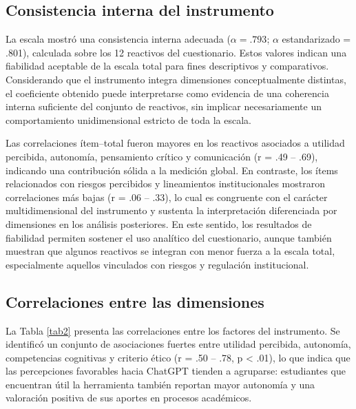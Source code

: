 \documentclass[spanish]{textolivre}
\begin{document}
\subsection{Consistencia interna del instrumento}

La escala mostró una consistencia interna adecuada ($\alpha = .793$; $\alpha$ estandarizado = .801), calculada sobre los 12 reactivos del cuestionario. Estos valores indican una fiabilidad aceptable de la escala total para fines descriptivos y comparativos. Considerando que el instrumento integra dimensiones conceptualmente distintas, el coeficiente obtenido puede interpretarse como evidencia de una coherencia interna suficiente del conjunto de reactivos, sin implicar necesariamente un comportamiento unidimensional estricto de toda la escala.

Las correlaciones ítem–total fueron mayores en los reactivos asociados a utilidad percibida, autonomía, pensamiento crítico y comunicación (r = .49 – .69), indicando una contribución sólida a la medición global. En contraste, los ítems relacionados con riesgos percibidos y lineamientos institucionales mostraron correlaciones más bajas (r = .06 – .33), lo cual es congruente con el carácter multidimensional del instrumento y sustenta la interpretación diferenciada por dimensiones en los análisis posteriores. En este sentido, los resultados de fiabilidad permiten sostener el uso analítico del cuestionario, aunque también muestran que algunos reactivos se integran con menor fuerza a la escala total, especialmente aquellos vinculados con riesgos y regulación institucional.

\subsection{Correlaciones entre las dimensiones}

La Tabla \ref{tab2} presenta las correlaciones entre los factores del instrumento. Se identificó un conjunto de asociaciones fuertes entre utilidad percibida, autonomía, competencias cognitivas y criterio ético (r = .50 – .78, p < .01), lo que indica que las percepciones favorables hacia ChatGPT tienden a agruparse: estudiantes que encuentran útil la herramienta también reportan mayor autonomía y una valoración positiva de sus aportes en procesos académicos.
\end{document}
